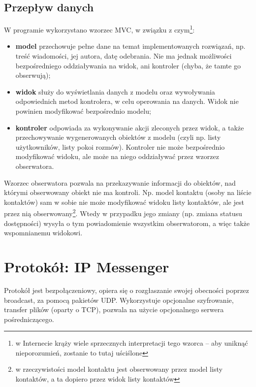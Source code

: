 \documentclass[11pt,leqno]{article}
\begin{document}
\subsection{Przepływ danych}

W programie wykorzystano wzorzec MVC, w związku z czym\footnote{w Internecie krąży wiele
sprzecznych interpretacji tego wzorca -- aby uniknąć nieporozumień, zostanie to tutaj uściślone}:
\begin{itemize}
	\item \textbf{model} przechowuje pełne dane na temat implementowanych rozwiązań, np. treść
	wiadomości, jej autora, datę odebrania. Nie ma jednak możliwości bezpośredniego oddziaływania
	na widok, ani kontroler (chyba, że tamte go obserwują);
	\item \textbf{widok} służy do wyświetlania danych z modelu oraz wywoływania odpowiednich metod
	kontrolera, w celu operowania na danych. Widok nie powinien modyfikować bezpośrednio modelu;
	\item \textbf{kontroler} odpowiada za wykonywanie akcji zleconych przez widok, a także
	przechowywanie wygenerowanych obiektów z modelu (czyli np. listy użytkowników, listy pokoi
	rozmów). Kontroler nie może bezpośrednio modyfikować widoku, ale może na niego oddziaływać
	przez wzorzez obserwatora.
\end{itemize}

Wzorzec obserwatora pozwala na przekazywanie informacji do obiektów, nad którymi obserwowany
obiekt nie ma kontroli. Np. model kontaktu (osoby na liście kontaktów) sam w sobie nie może
modyfikować widoku listy kontaktów, ale jest przez nią obserwowany\footnote{w rzeczywistości model kontaktu
jest obserwowany przez model listy kontaktów, a ta dopiero przez widok listy kontaktów}. Wtedy
w przypadku jego zmiany (np. zmiana statusu dostępności) wysyła o tym powiadomienie wszystkim
obserwatorom, a więc także wspomnianemu widokowi.


\section{Protokół: IP Messenger}

Protokół jest bezpołączeniowy, opiera się o rozgłaszanie swojej obecności poprzez broadcast, za
pomocą pakietów UDP. Wykorzystuje opcjonalne szyfrowanie, transfer plików (oparty o TCP), pozwala na
użycie opcjonalnego serwera pośredniczącego.
\end{document}
